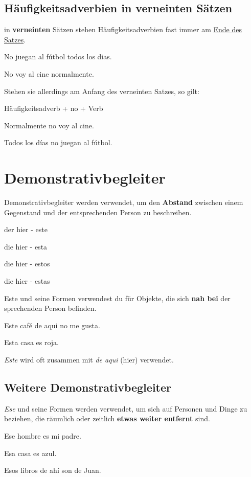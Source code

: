 \subsection*{Häufigkeitsadverbien in verneinten Sätzen}
in \textbf{verneinten} Sätzen stehen Häufigkeitsadverbien
fast immer am \underline{Ende des Satzes}.
\begin{ejemplos}
    \item No juegan al f\'utbol todos los dias.
    \item No voy al cine normalmente.
\end{ejemplos}
Stehen sie allerdings am Anfang des verneinten Satzes, so gilt:
\begin{gramatica}
    \item Häufigkeitsadverb + no + Verb
\end{gramatica}

\begin{ejemplos}
    \item Normalmente no voy al cine.
    \item Todos los d\'ias no juegan al f\'utbol. 
\end{ejemplos}
\section{Demonstrativbegleiter}
Demonstrativbegleiter werden verwendet, um den \textbf{Abstand}
zwischen einem Gegenstand und der entsprechenden Person zu 
beschreiben.
\begin{gramatica}
    \item der hier - este
    \item die hier - esta
    \item die hier - estos
    \item die hier - estas
\end{gramatica}
Este und seine Formen verwendest du für Objekte, die sich 
\textbf{nah bei} der sprechenden Person befinden.
\begin{ejemplos}
    \item Este caf\'e de aqui no me gusta.
    \item Esta casa es roja.
\end{ejemplos}
\textit{Este} wird oft zusammen mit \textit{de aqui} (hier) 
verwendet.
\subsection*{Weitere Demonstrativbegleiter}
\textit{Ese} und seine Formen werden verwendet, um sich auf
Personen und Dinge zu beziehen, die räumlich oder zeitlich
\textbf{etwas weiter entfernt} sind.
\begin{ejemplos}
    \item Ese hombre es mi padre.
    \item Esa casa es azul.
    \item Esos libros de ah\'i son de Juan.
\end{ejemplos}
